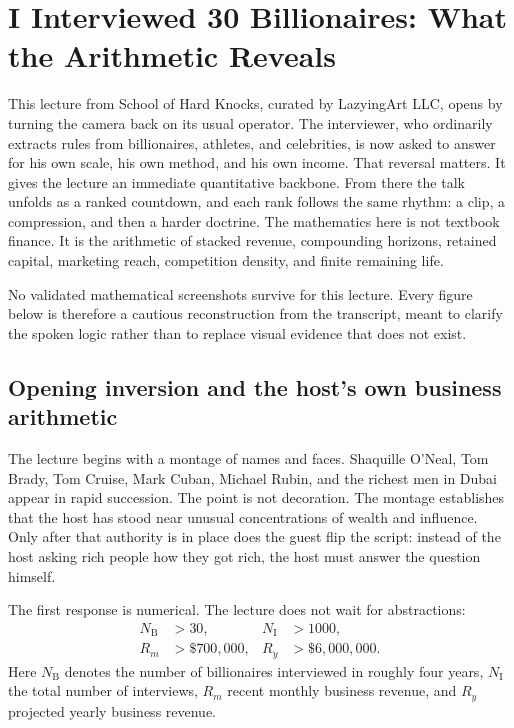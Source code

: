 \chapter{I Interviewed 30 Billionaires: What the Arithmetic Reveals}

This lecture from School of Hard Knocks, curated by LazyingArt LLC, opens by turning the camera back on its usual operator. The interviewer, who ordinarily extracts rules from billionaires, athletes, and celebrities, is now asked to answer for his own scale, his own method, and his own income. That reversal matters. It gives the lecture an immediate quantitative backbone. From there the talk unfolds as a ranked countdown, and each rank follows the same rhythm: a clip, a compression, and then a harder doctrine. The mathematics here is not textbook finance. It is the arithmetic of stacked revenue, compounding horizons, retained capital, marketing reach, competition density, and finite remaining life.

\begin{remark}
No validated mathematical screenshots survive for this lecture. Every figure below is therefore a cautious reconstruction from the transcript, meant to clarify the spoken logic rather than to replace visual evidence that does not exist.
\end{remark}

\section{Opening inversion and the host's own business arithmetic}

The lecture begins with a montage of names and faces. Shaquille O'Neal, Tom Brady, Tom Cruise, Mark Cuban, Michael Rubin, and the richest men in Dubai appear in rapid succession. The point is not decoration. The montage establishes that the host has stood near unusual concentrations of wealth and influence. Only after that authority is in place does the guest flip the script: instead of the host asking rich people how they got rich, the host must answer the question himself.

The first response is numerical. The lecture does not wait for abstractions:
\begin{align}
N_{\mathrm{B}} &> 30, &
N_{\mathrm{I}} &> 1000, \\
R_m &> \$700{,}000, &
R_y &> \$6{,}000{,}000.
\end{align}
Here \(N_{\mathrm{B}}\) denotes the number of billionaires interviewed in roughly four years, \(N_{\mathrm{I}}\) the total number of interviews, \(R_m\) recent monthly business revenue, and \(R_y\) projected yearly business revenue.

